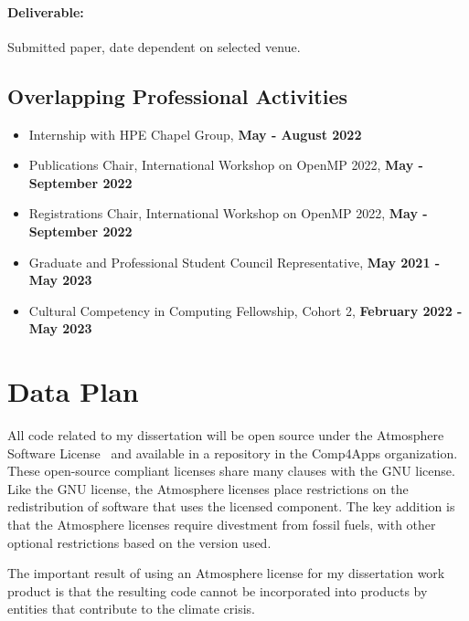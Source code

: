 \documentclass{article}
\begin{document}
\paragraph{Deliverable:} Submitted paper, date dependent on selected venue.


\subsection{Overlapping Professional Activities}
\begin{itemize}
\item Internship with HPE Chapel Group, \textbf{May - August 2022} 
\item Publications Chair, International Workshop on OpenMP 2022, \textbf{May - September 2022}
\item Registrations Chair, International Workshop on OpenMP 2022, \textbf{May - September 2022}
\item Graduate and Professional Student Council Representative, \textbf{May 2021 - May 2023}
\item Cultural Competency in Computing Fellowship, Cohort 2, \textbf{February 2022 - May 2023}
\end{itemize}

\section{Data Plan}
\label{Sec:DataPlan}
All code related to my dissertation will be open source under the Atmosphere Software License~\cite{atmospherelicense} and available in a repository in the Comp4Apps organization. 
These open-source compliant licenses share many clauses with the GNU license. 
Like the GNU license, the Atmosphere licenses place restrictions on the redistribution of software that uses the licensed component.
The key addition is that the Atmosphere licenses require divestment from fossil fuels, with other optional restrictions based on the version used. 

The important result of using an Atmosphere license for my dissertation work product is that the resulting code cannot be incorporated into products by entities that contribute to the climate crisis.




\end{document}
